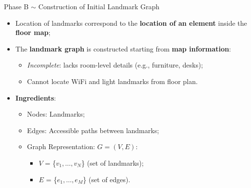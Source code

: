 \begin{frame}{Phase B $\sim$ Construction of Initial Landmark Graph}
    \begin{itemize}
        \item Location of landmarks correspond to the \textbf{location of an element} inside the \textbf{floor map};
        \item The \textbf{landmark graph} is constructed starting from \textbf{map information}:
            \begin{itemize}
                \item \textit{Incomplete}: lacks room-level details (e.g., furniture, desks);
                \item Cannot locate WiFi and light landmarks from floor plan.
            \end{itemize}
        \item \textbf{Ingredients}:
            \begin{itemize}
                \item Nodes: Landmarks;
                \item Edges: Accessible paths between landmarks;
                \item Graph Representation: $G = (V, E)$:
                \begin{itemize}
                    \item $V$ = \{$v_1, \dots, v_N$\} (set of landmarks);
                    \item $E$ = \{$e_1, \dots, e_M$\} (set of edges).
                \end{itemize}
            \end{itemize}
    \end{itemize}
\end{frame}

